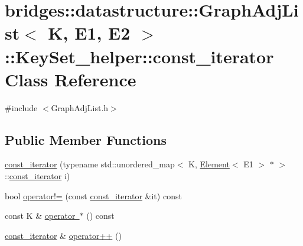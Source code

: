 \hypertarget{classbridges_1_1datastructure_1_1_graph_adj_list_1_1_key_set__helper_1_1const__iterator}{}\section{bridges\+::datastructure\+::Graph\+Adj\+List$<$ K, E1, E2 $>$\+::Key\+Set\+\_\+helper\+::const\+\_\+iterator Class Reference}
\label{classbridges_1_1datastructure_1_1_graph_adj_list_1_1_key_set__helper_1_1const__iterator}


{\ttfamily \#include $<$Graph\+Adj\+List.\+h$>$}

\subsection*{Public Member Functions}
\begin{DoxyCompactItemize}
\item 
\mbox{\hyperlink{classbridges_1_1datastructure_1_1_graph_adj_list_1_1_key_set__helper_1_1const__iterator_a028172e70957f093f02ee95c77d89392}{const\+\_\+iterator}} (typename std\+::unordered\+\_\+map$<$ K, \mbox{\hyperlink{classbridges_1_1datastructure_1_1_element}{Element}}$<$ E1 $>$ $\ast$ $>$\+::\mbox{\hyperlink{classbridges_1_1datastructure_1_1_graph_adj_list_1_1_key_set__helper_1_1const__iterator}{const\+\_\+iterator}} i)
\item 
bool \mbox{\hyperlink{classbridges_1_1datastructure_1_1_graph_adj_list_1_1_key_set__helper_1_1const__iterator_a373e0c206d63dfda41108ebfcfae5fe8}{operator!=}} (const \mbox{\hyperlink{classbridges_1_1datastructure_1_1_graph_adj_list_1_1_key_set__helper_1_1const__iterator}{const\+\_\+iterator}} \&it) const
\item 
const K \& \mbox{\hyperlink{classbridges_1_1datastructure_1_1_graph_adj_list_1_1_key_set__helper_1_1const__iterator_a37788c949f9e89a80dfbdd9288633ae5}{operator $\ast$}} () const
\item 
\mbox{\hyperlink{classbridges_1_1datastructure_1_1_graph_adj_list_1_1_key_set__helper_1_1const__iterator}{const\+\_\+iterator}} \& \mbox{\hyperlink{classbridges_1_1datastructure_1_1_graph_adj_list_1_1_key_set__helper_1_1const__iterator_acbeb342b54bfdb8ece520e9d5cbf66db}{operator++}} ()
\end{DoxyCompactItemize}


